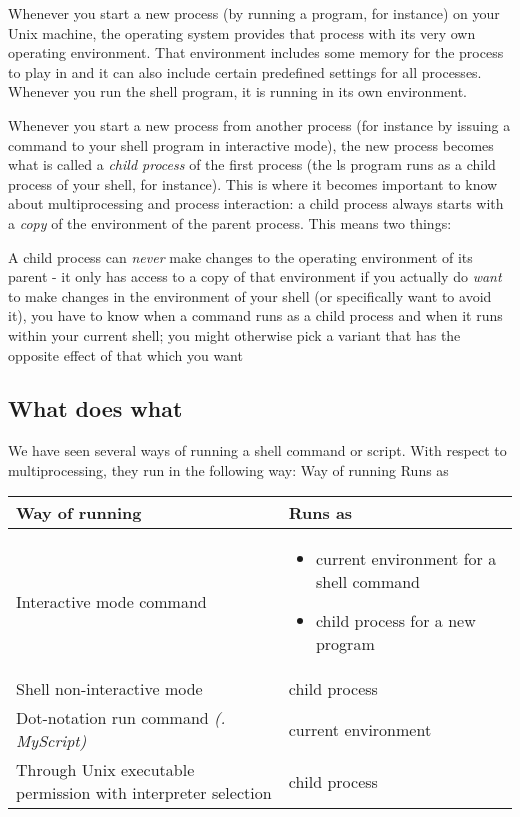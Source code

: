 Whenever you start a new process (by running a program, for instance) on your
Unix machine, the operating system provides that process with its very own
operating environment. That environment includes some memory for the process to
play in and it can also include certain predefined settings for all processes.
Whenever you run the shell program, it is running in its own environment.

Whenever you start a new process from another process (for instance by issuing
a command to your shell program in interactive mode), the new process becomes
what is called a \textit{child process} of the first process (the ls program
runs as a child process of your shell, for instance). This is where it becomes
important to know about multiprocessing and process interaction: a child
process always starts with a \textit{copy} of the environment of the parent
process. This means two things:

A child process can \textit{never} make changes to the operating environment
of its parent - it only has access to a copy of that environment if you
actually do \textit{want} to make changes in the environment of your shell (or
specifically want to avoid it), you have to know when a command runs as a child
process and when it runs within your current shell; you might otherwise pick a
variant that has the opposite effect of that which you want

\subsection{What does what}
We have seen several ways of running a shell command or script. With respect to
multiprocessing, they run in the following way:
Way of running Runs as

\begin{tabular}{|p{3cm}|p{3cm}|}
\hline
Way of running & Runs as\\ \hline
Interactive mode command & \begin{itemize}
\item current environment for a shell command
\item child process for a new program
\end{itemize} \\ \hline
Shell non-interactive mode &child process\\ \hline
Dot-notation run command \textit{(. MyScript)} & current environment\\ \hline
Through Unix executable permission with interpreter selection & child process\\
\hline
\end{tabular}

